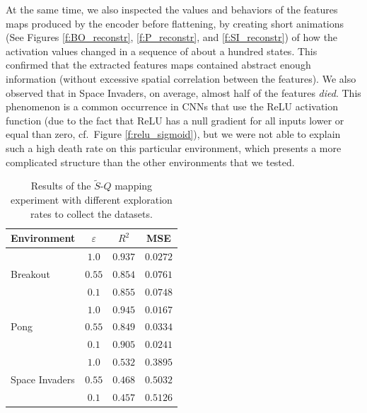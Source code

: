 At the same time, we also inspected the values and behaviors of the features 
maps produced by the encoder before flattening, by creating short animations 
(See Figures \ref{f:BO_reconstr}, \ref{f:P_reconstr}, and \ref{f:SI_reconstr}) 
of how the activation values changed in a sequence of about a hundred states. 
This confirmed that the extracted features maps contained abstract enough 
information (without excessive spatial correlation between the features). We 
also observed that in Space Invaders, on average, almost half of the features
\textit{died}. This phenomenon is a common occurrence in CNNs that use the ReLU 
activation function (due to the fact that ReLU has a null gradient for
all inputs lower or equal than zero, cf.\ Figure \ref{f:relu_sigmoid}), but
we were not able to explain such a high death rate on this particular 
environment, which presents a more complicated structure than the other
environments that we tested.
%
\begin{table}[t]
    \centering
    \begin{tabular}{l c c c} 
	\hline
	Environment                     & $\varepsilon$ & $R^2$   & MSE \\ 
	\hline 
	\multirow{3}{*}{Breakout}       & $1.0$         & $0.937$ & $0.0272$ \\
	                                & $0.55$        & $0.854$ & $0.0761$ \\
	                                & $0.1$         & $0.855$ & $0.0748$ \\
	\hline
	\multirow{3}{*}{Pong}           & $1.0$         & $0.945$ & $0.0167$ \\
	                                & $0.55$        & $0.849$ & $0.0334$ \\
	                                & $0.1$         & $0.905$ & $0.0241$ \\
	\hline
	\multirow{3}{*}{Space Invaders} & $1.0$         & $0.532$ & $0.3895$ \\
	                                & $0.55$        & $0.468$ & $0.5032$ \\
	                                & $0.1$         & $0.457$ & $0.5126$ \\
	\hline
    \end{tabular}
    \caption[Results of $\tilde{S}$-$Q$ mapping experiment]{Results of the 
	     $\tilde{S}$-$Q$ mapping experiment with different exploration rates
	     to collect the datasets.}
    \label{t:FQ_tests}
\end{table}
%

